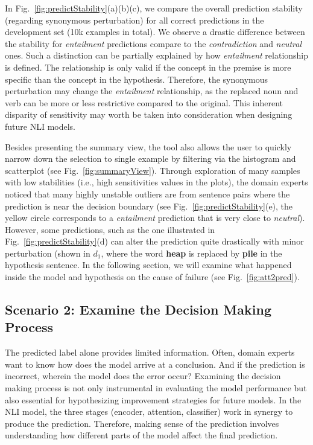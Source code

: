 In Fig.~\ref{fig:predictStability}(a)(b)(c), we compare the overall prediction stability (regarding synonymous perturbation) for all correct predictions in the development set (10k examples in total).
%
We observe a drastic difference between the stability for \emph{entailment} predictions compare to the \emph{contradiction} and \emph{neutral} ones.
%
Such a distinction can be partially explained by how \emph{entailment} relationship is defined. The relationship is only valid if the concept in the premise is more specific than the concept in the hypothesis. Therefore, the synonymous perturbation may change the \emph{entailment} relationship, as the replaced noun and verb can be more or less restrictive compared to the original.
This inherent disparity of sensitivity may worth be taken into consideration when designing future NLI models.

Besides presenting the summary view, the tool also allows the user to quickly narrow down the selection to single example by filtering via the histogram and scatterplot (see Fig.~\ref{fig:summaryView}).
%
Through exploration of many samples with low stabilities (i.e., high sensitivities values in the plots), the domain experts noticed that many highly unstable outliers are from sentence pairs where the prediction is near the decision boundary (see Fig.~\ref{fig:predictStability}(e), the yellow circle corresponds to a \emph{entailment} prediction that is very close to \emph{neutral}).
However, some predictions, such as the one illustrated in Fig.~\ref{fig:predictStability}(d) can alter the prediction quite drastically with minor perturbation (shown in $d_1$, where the word \textbf{heap} is replaced by \textbf{pile} in the hypothesis sentence. In the following section, we will examine what happened inside the model and hypothesis on the cause of failure (see Fig.~\ref{fig:att2pred}).

\subsection{Scenario 2: Examine the Decision Making Process}
The predicted label alone provides limited information. Often, domain experts want to know how does the model arrive at a conclusion. And if the prediction is incorrect, wherein the model does the error occur?
Examining the decision making process is not only instrumental in evaluating the model performance but also essential for hypothesizing improvement strategies for future models.
%
In the NLI model, the three stages (encoder, attention, classifier) work in synergy to produce the prediction.
Therefore, making sense of the prediction involves understanding how different parts of the model affect the final prediction.

